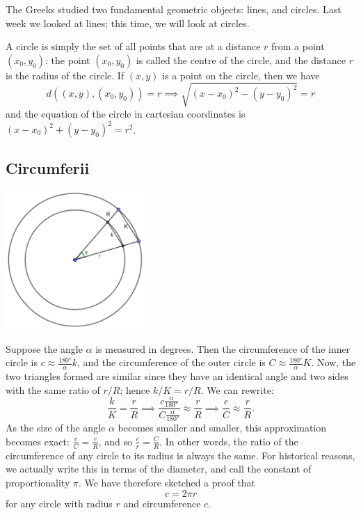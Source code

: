 



The Greeks studied two fundamental geometric objects: lines, and circles. Last week we looked at lines; this time, we will look at
circles.

A circle is simply the set of all points that are at a distance $ r $ from a point $ (x_0, y_0) $: the point $ (x_0,y_0) $ is called
the centre of the circle, and the distance $ r $ is the radius of the circle. If $ (x,y) $ is a point on the circle, then we have
\begin{displaymath}
  d((x,y), (x_0,y_0)) = r \implies \sqrt{(x - x_0)^2 - (y - y_0)^2} = r
\end{displaymath}
and the equation of the circle in cartesian coordinates is $ (x - x_0)^2 + (y - y_0)^2 = r^2 $.

\subsection*{Circumferii}
\begin{center}
  \includegraphics[width=0.4\textwidth]{pi}
\end{center}

Suppose the angle $ \alpha $ is measured in degrees. Then the circumference of the inner circle is $ c \approx \frac{\ang{180}}{\alpha} k $,
and the circumference of the outer circle is $ C \approx \frac{\ang{180}}{\alpha} K $. Now, the two triangles formed are similar since
they have an identical angle and two sides with the same ratio of $ r/R $; hence $ k/K = r/R $. We can rewrite:
\begin{displaymath}
  \frac{k}{K} = \frac{r}{R} \implies \frac{c \frac{\alpha}{\ang{180}}}{C \frac{\alpha}{\ang{180}}} \approx \frac{r}{R} \implies \frac{c}{C} \approx \frac{r}{R}.
\end{displaymath}
As the size of the angle $ \alpha $ becomes smaller and smaller, this approximation becomes exact: $ \frac{c}{C} = \frac{r}{R} $, and
so $ \frac{c}{r} = \frac{C}{R} $. In other words, the ratio of the circumference of any circle to its radius is always the same. For historical
reasons, we actually write this in terms of the diameter, and call the constant of proportionality $ \pi $. We have therefore sketched a
proof that
\begin{displaymath}
  c = 2\pi r
\end{displaymath}
for any circle with radius $ r $ and circumference $ c $.

